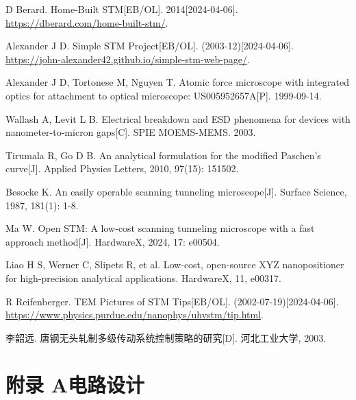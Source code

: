 \documentclass{article}
\begin{document}
\begin{thebibliography}{25}
	 D Berard. Home-Built STM[EB/OL]. 2014[2024-04-06]. \href{https://dberard.com/home-built-stm/}{https://dberard.com/home-built-stm/}.

	 Alexander J D. Simple STM Project[EB/OL]. (2003-12)[2024-04-06]. \href{https://john-alexander42.github.io/simple-stm-web-page/}{https://john-alexander42.github.io/simple-stm-web-page/}.

	 Alexander J D, Tortonese M, Nguyen T. Atomic force microscope with integrated optics for attachment to optical microscope: US005952657A[P]. 1999-09-14.

	 Wallash A, Levit L B. Electrical breakdown and ESD phenomena for devices with nanometer-to-micron gaps[C]. SPIE MOEMS-MEMS. 2003.

	 Tirumala R, Go D B. An analytical formulation for the modified Paschen’s curve[J]. Applied Physics Letters, 2010, 97(15): 151502.

	 Besocke K. An easily operable scanning tunneling microscope[J]. Surface Science, 1987, 181(1): 1-8.

	 Ma W. Open STM: A low-cost scanning tunneling microscope with a fast approach method[J]. HardwareX, 2024, 17: e00504.

	 Liao H S, Werner C, Slipets R, et al. Low-cost, open-source XYZ nanopositioner for high-precision analytical applications. HardwareX, 11, e00317.

	 R Reifenberger. TEM Pictures of STM Tips[EB/OL]. (2002-07-19)[2024-04-06]. \href{https://www.physics.purdue.edu/nanophys/uhvstm/tip.html}{https://www.physics.purdue.edu/nanophys/uhvstm/tip.html}.

	 李韶远. 唐钢无头轧制多级传动系统控制策略的研究[D]. 河北工业大学, 2003.

\end{thebibliography}



\clearpage
\appendix
\section*{附录 A\quad 电路设计}
\label{app:A}
\end{document}
